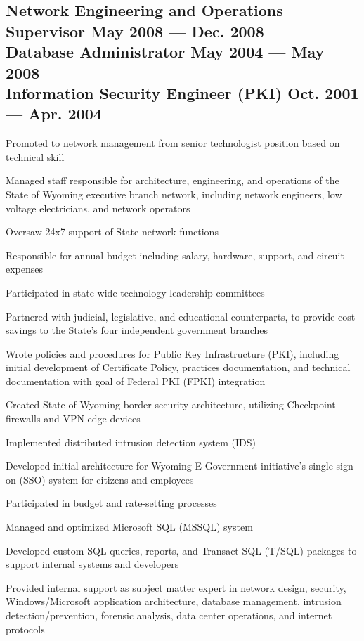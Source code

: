 \documentclass[letter,10pt]{article}
\begin{document}
\subsection{Network Engineering and Operations Supervisor \hfill \textrm{\textmd{May 2008 --- Dec. 2008}}\\
	Database Administrator \hfill \textrm{\textmd{May 2004 --- May 2008}}\\
	Information Security Engineer (PKI) \hfill \textrm{\textmd{Oct.  2001 --- Apr. 2004}}}
\begin{zitemize}
	\item Promoted to network management from senior technologist
	position based on technical skill
	\item Managed staff responsible for architecture, engineering,
	and operations of the State of Wyoming executive branch
	network, including network engineers, low voltage
	electricians, and network operators
	\item Oversaw 24x7 support of State network functions
	\item Responsible for annual budget including salary, hardware,
	support, and circuit expenses
	\item Participated in state-wide technology leadership committees
	\item Partnered with judicial, legislative, and educational
	counterparts, to provide cost-savings to the State's
	four independent government branches
	\item Wrote policies and procedures for Public Key
	Infrastructure (PKI), including initial development of
	Certificate Policy, practices documentation, and
	technical documentation with goal of Federal PKI (FPKI)
	integration
	\item Created State of Wyoming border security architecture,
	utilizing Checkpoint firewalls and VPN edge devices
	\item Implemented distributed intrusion detection system (IDS)
	\item Developed initial architecture for Wyoming E-Government
	initiative's single sign-on (SSO) system for citizens and
	employees
	\item Participated in budget and rate-setting processes
	\item Managed and optimized Microsoft SQL (MSSQL) system
	\item Developed custom SQL queries, reports, and Transact-SQL
	(T/SQL) packages to support internal systems and
	developers
	\item Provided internal support as subject matter expert in
	network design, security, Windows/Microsoft application
	architecture, database management, intrusion
	detection/prevention, forensic analysis, data center
	operations, and internet protocols
\end{zitemize}
\end{document}
